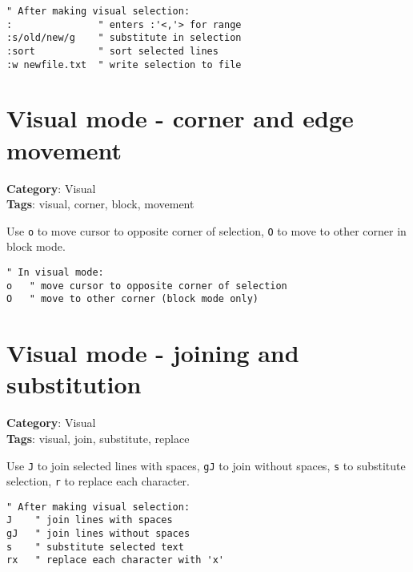 {{{{{{{{{{{{{{{{{{{\begin{Exa*}{}
\begin{Verbatim}[fontsize=\footnotesize, breaklines, breakanywhere]
" After making visual selection:
:               " enters :'<,'> for range
:s/old/new/g    " substitute in selection
:sort           " sort selected lines
:w newfile.txt  " write selection to file
\end{Verbatim}
\end{Exa*}

\section{Visual mode - corner and edge movement}

\textbf{Category}: Visual\\ \textbf{Tags}: visual, corner, block, movement
\vspace{0.5cm}

Use {\footnotesize \Verb§o§} to move cursor to opposite corner of selection, {\footnotesize \Verb§O§} to move to other corner in block mode.

\begin{Exa*}{}
\begin{Verbatim}[fontsize=\footnotesize, breaklines, breakanywhere]
" In visual mode:
o   " move cursor to opposite corner of selection
O   " move to other corner (block mode only)
\end{Verbatim}
\end{Exa*}

\section{Visual mode - joining and substitution}

\textbf{Category}: Visual\\ \textbf{Tags}: visual, join, substitute, replace
\vspace{0.5cm}

Use {\footnotesize \Verb§J§} to join selected lines with spaces, {\footnotesize \Verb§gJ§} to join without spaces, {\footnotesize \Verb§s§} to substitute selection, {\footnotesize \Verb§r§} to replace each character.

\begin{Exa*}{}
\begin{Verbatim}[fontsize=\footnotesize, breaklines, breakanywhere]
" After making visual selection:
J    " join lines with spaces
gJ   " join lines without spaces
s    " substitute selected text
rx   " replace each character with 'x'
\end{Verbatim}
\end{Exa*}

}}}}}}}}}}}}}}}}}}}
